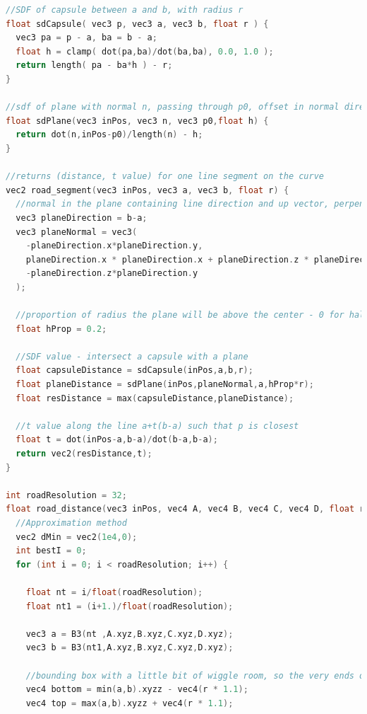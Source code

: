 \documentclass[11pt]{article}
\begin{document}
\begin{lstlisting}[language=C++,label={road_code},caption={\texttt{road\_distance} is the SDF for part of the shape defined by a single cubic Bezier curve. When an interpolation spline consisting of multiple curves is required, a \texttt{Brush} object is created for each.}]
//SDF of capsule between a and b, with radius r
float sdCapsule( vec3 p, vec3 a, vec3 b, float r ) {
  vec3 pa = p - a, ba = b - a;
  float h = clamp( dot(pa,ba)/dot(ba,ba), 0.0, 1.0 );
  return length( pa - ba*h ) - r;
}

//sdf of plane with normal n, passing through p0, offset in normal direction by h
float sdPlane(vec3 inPos, vec3 n, vec3 p0,float h) {
  return dot(n,inPos-p0)/length(n) - h;
}

//returns (distance, t value) for one line segment on the curve
vec2 road_segment(vec3 inPos, vec3 a, vec3 b, float r) {
  //normal in the plane containing line direction and up vector, perpendicular to direction
  vec3 planeDirection = b-a;
  vec3 planeNormal = vec3(
    -planeDirection.x*planeDirection.y,
    planeDirection.x * planeDirection.x + planeDirection.z * planeDirection.z, 
    -planeDirection.z*planeDirection.y
  );

  //proportion of radius the plane will be above the center - 0 for half-circle cross-section, 1 for circle cross-section
  float hProp = 0.2;

  //SDF value - intersect a capsule with a plane
  float capsuleDistance = sdCapsule(inPos,a,b,r);
  float planeDistance = sdPlane(inPos,planeNormal,a,hProp*r);
  float resDistance = max(capsuleDistance,planeDistance);

  //t value along the line a+t(b-a) such that p is closest
  float t = dot(inPos-a,b-a)/dot(b-a,b-a);
  return vec2(resDistance,t);
}

int roadResolution = 32;
float road_distance(vec3 inPos, vec4 A, vec4 B, vec4 C, vec4 D, float r) {
  //Approximation method
  vec2 dMin = vec2(1e4,0);
  int bestI = 0;
  for (int i = 0; i < roadResolution; i++) {

    float nt = i/float(roadResolution);
    float nt1 = (i+1.)/float(roadResolution);

    vec3 a = B3(nt ,A.xyz,B.xyz,C.xyz,D.xyz);
    vec3 b = B3(nt1,A.xyz,B.xyz,C.xyz,D.xyz);

    //bounding box with a little bit of wiggle room, so the very ends of the line are always generated properly
    vec4 bottom = min(a,b).xyzz - vec4(r * 1.1);
    vec4 top = max(a,b).xyzz + vec4(r * 1.1);


\end{lstlisting}
\end{document}
